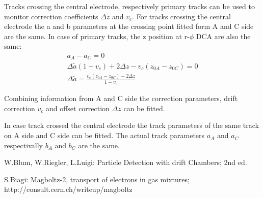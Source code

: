 \documentclass{elsart}
\begin{document}
Tracks crossing the central electrode, respectively primary tracks can be used to
monitor correction coefficients $\Delta{z}$ and $v_c$. For tracks crossing the central electrode the a and b parameters at the crossing point fitted form A and C side are the same. In case of primary tracks, the z position at r-$\phi$ DCA are also the same:
\begin{equation}
\begin{split}
a_A-a_C=0 \\
\Delta\tilde{a}(1-v_c)+2\Delta{z}-v_c(z_{0A}-z_{0C})=0 \\
\Delta\tilde{a}=\frac{v_c(z_{0A}-z_{0C})-2\Delta{z}}{1-v_c}	
\end{split}
\end{equation}

Combining information from A and C side the correction parameters, drift correction $v_c$ and offset correction $\Delta{z}$ can be fitted.

In case track crossed the central electrode the track parameters of the same track on A side and C side can be fitted.
The actual track parameters $a_A$ and $a_C$  respectivally $b_A$ and $b_C$ are the same.



\begin{thebibliography}{99}

W.Blum, W.Riegler, L.Luigi: Particle Detection with drift Chambers; 2nd ed.

S.Biagi: Magboltz-2, transport of electrons in gas mixtures; http://consult.cern.ch/writeup/magboltz



 \end{thebibliography}
\end{document}
